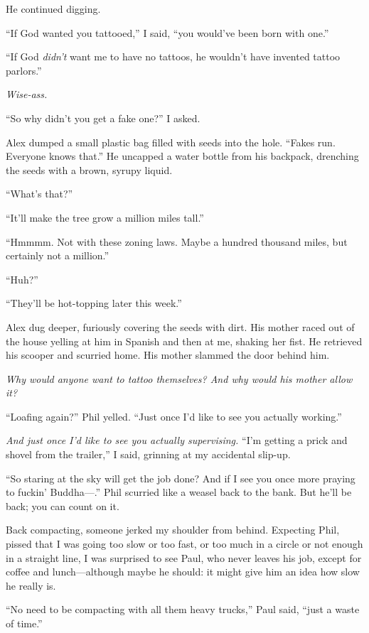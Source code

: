 He continued digging.

``If God wanted you tattooed,'' I said, ``you would've been born with
one.''

``If God \emph{didn't} want me to have no tattoos, he wouldn't have
invented tattoo parlors.''

\emph{Wise-ass.}

``So why didn't you get a fake one?'' I asked.

Alex dumped a small plastic bag filled with seeds into the hole. ``Fakes
run. Everyone knows that.'' He uncapped a water bottle from his
backpack, drenching the seeds with a brown, syrupy liquid.

``What's that?''

``It'll make the tree grow a million miles tall.''

``Hmmmm. Not with these zoning laws. Maybe a hundred thousand miles, but
certainly not a million.''

``Huh?''

``They'll be hot-topping later this week.''

Alex dug deeper, furiously covering the seeds with dirt. His mother
raced out of the house yelling at him in Spanish and then at me, shaking
her fist. He retrieved his scooper and scurried home. His mother slammed
the door behind him.

\emph{Why would anyone want to tattoo themselves? And why would his
mother allow it?}

``Loafing again?'' Phil yelled. ``Just once I'd like to see you actually
working.''

\emph{And just once I'd like to see you actually supervising.} ``I'm
getting a prick and shovel from the trailer,'' I said, grinning at my
accidental slip-up.

``So staring at the sky will get the job done? And if I see you once
more praying to fuckin' Buddha---.'' Phil scurried like a weasel back to
the bank. But he'll be back; you can count on it.

Back compacting, someone jerked my shoulder from behind. Expecting Phil,
pissed that I was going too slow or too fast, or too much in a circle or
not enough in a straight line, I was surprised to see Paul, who never
leaves his job, except for coffee and lunch---although maybe he should:
it might give him an idea how slow he really is.

``No need to be compacting with all them heavy trucks,'' Paul said,
``just a waste of time.''

